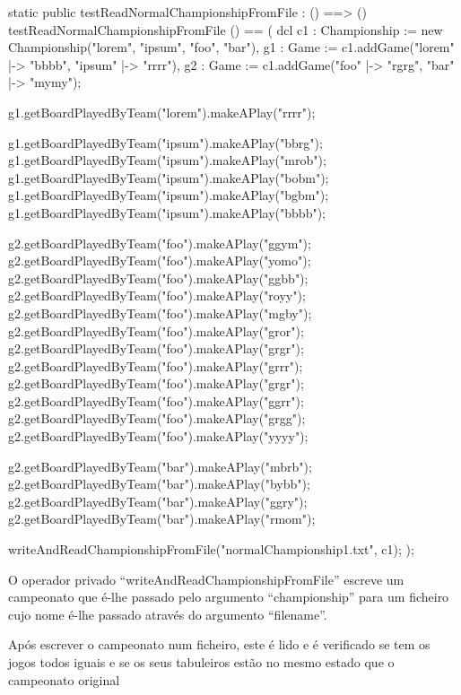 \begin{vdm_al}  
    static public testReadNormalChampionshipFromFile : () ==> ()
    testReadNormalChampionshipFromFile () == (
      dcl c1 : Championship := new Championship({"lorem", "ipsum", "foo", "bar"}),
        g1 : Game := c1.addGame({"lorem" |-> "bbbb", "ipsum" |-> "rrrr"}),
        g2 : Game := c1.addGame({"foo" |-> "rgrg", "bar" |-> "mymy"});
  
        g1.getBoardPlayedByTeam("lorem").makeAPlay("rrrr");
  
        g1.getBoardPlayedByTeam("ipsum").makeAPlay("bbrg");
        g1.getBoardPlayedByTeam("ipsum").makeAPlay("mrob");
        g1.getBoardPlayedByTeam("ipsum").makeAPlay("bobm");
        g1.getBoardPlayedByTeam("ipsum").makeAPlay("bgbm");
        g1.getBoardPlayedByTeam("ipsum").makeAPlay("bbbb");
  
        g2.getBoardPlayedByTeam("foo").makeAPlay("ggym");
        g2.getBoardPlayedByTeam("foo").makeAPlay("yomo");
        g2.getBoardPlayedByTeam("foo").makeAPlay("ggbb");
        g2.getBoardPlayedByTeam("foo").makeAPlay("royy");
        g2.getBoardPlayedByTeam("foo").makeAPlay("mgby");
        g2.getBoardPlayedByTeam("foo").makeAPlay("gror");
        g2.getBoardPlayedByTeam("foo").makeAPlay("grgr");
        g2.getBoardPlayedByTeam("foo").makeAPlay("grrr");
        g2.getBoardPlayedByTeam("foo").makeAPlay("grgr");
        g2.getBoardPlayedByTeam("foo").makeAPlay("ggrr");
        g2.getBoardPlayedByTeam("foo").makeAPlay("grgg");
        g2.getBoardPlayedByTeam("foo").makeAPlay("yyyy");
  
        g2.getBoardPlayedByTeam("bar").makeAPlay("mbrb");
        g2.getBoardPlayedByTeam("bar").makeAPlay("bybb");
        g2.getBoardPlayedByTeam("bar").makeAPlay("ggry");
        g2.getBoardPlayedByTeam("bar").makeAPlay("rmom");
  
        writeAndReadChampionshipFromFile("normalChampionship1.txt", c1);
      );
\end{vdm_al}

O operador privado ``writeAndReadChampionshipFromFile'' escreve um
campeonato que é-lhe passado pelo argumento ``championship'' para um
ficheiro cujo nome é-lhe passado através do argumento ``filename''.

Após escrever o campeonato num ficheiro, este é lido e é verificado se
tem os jogos todos iguais e se os seus tabuleiros estão no mesmo
estado que o campeonato original

